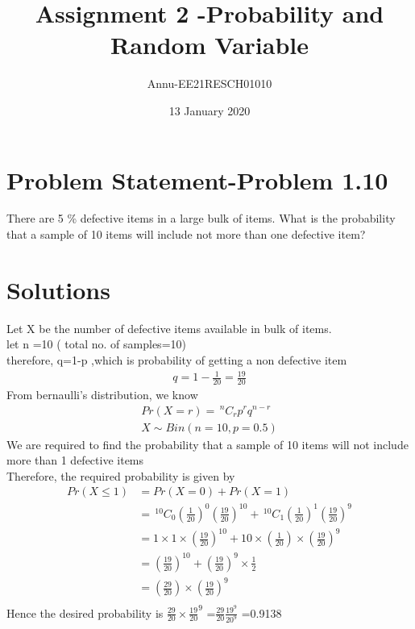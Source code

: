 \documentclass[journel,12pt]{IEEEtran}
\title{Assignment 2 -Probability and Random Variable}
\author{Annu-EE21RESCH01010}
\date{13 January 2020}
\providecommand{\nCr}[2]{\,^{#1}C_{#2}}
\begin{document}
 
 \maketitle

 
 
 \section{Problem Statement-Problem 1.10}
There are 5 \% defective items in a large bulk of items. What is the probability that a sample of 10 items will include not more than one defective item?

\section{Solutions}

Let X be the number of defective items available in bulk of items. \\
let n =10 ( total no. of samples=10)\\
therefore, q=1-p ,which is probability of getting a non defective item\\
\begin{align}
    q=1-\frac{1}{20}=\frac{19}{20}
\end{align}
From bernaulli's distribution, we know\\
\begin{align}
    Pr(X=r)= \nCr{n}{r} p^r q^{n-r}\\
    X \sim Bin(n=10,p=0.5)
\end{align}
We are required to find the probability that a sample of 10 items will not include more than 1 defective items\\




Therefore, the required probability is given by\\
\begin{align*}
Pr(X \le 1)&=Pr(X=0)+Pr(X=1) \\
              &=\nCr{10}{0}\left(\frac{1}{20}\right)^0 \left(\frac{19}{20}\right)^{10}+\nCr{10}{1} \left(\frac{1}{20}\right)^1 \left(\frac{19}{20}\right)^{9}\\
              &=1\times 1\times \left(\frac{19}{20}\right) ^{10}+10\times\left(\frac{1}{20}\right)\times \left(\frac{19}{20}\right)^{9}\\
              &=\left(\frac{19}{20}\right)^{10}+\left(\frac{19}{20}\right) ^{9}\times \frac{1}{2}\\
              &=\left(\frac{29}{20}\right) \times\left (\frac{19}{20}\right) ^{9}\\
\end{align*}
Hence the desired probability is $\frac{29}{20}\times \frac{19}{20}^9$ =$ \frac{29}{20} \frac{19^9}{20^9}$
=0.9138
             
\end{document}
